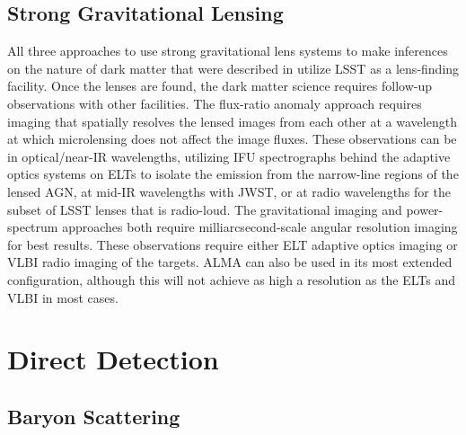 \subsection{Strong Gravitational Lensing}
\label{sec:SLcomplement}

All three approaches to use strong gravitational lens systems to make inferences on the nature of dark matter that were described in  utilize LSST as a lens-finding facility.
Once the lenses are found, the dark matter science requires follow-up observations with other facilities.
The flux-ratio anomaly approach requires imaging that spatially resolves the lensed images from each other at a wavelength at which microlensing does not affect the image fluxes.
These observations can be in optical/near-IR wavelengths, utilizing IFU spectrographs behind the adaptive optics systems on ELTs to isolate the emission from the narrow-line regions of the lensed AGN, at mid-IR wavelengths with JWST, or at radio wavelengths for the subset of LSST lenses that is radio-loud.
The gravitational imaging and power-spectrum approaches both require milliarcsecond-scale angular resolution imaging for best results.
These observations require either ELT adaptive optics imaging or VLBI radio imaging of the targets.
ALMA can also be used in its most extended configuration, although this will not achieve as high a resolution as the ELTs and VLBI in most cases.



\section{Direct Detection }

\subsection{Baryon Scattering }

